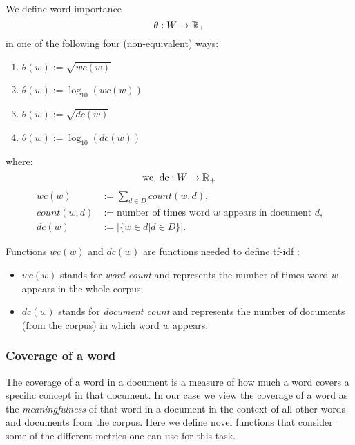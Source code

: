 \begin{definition}
  \label{def:word-importance}
  We define word importance
  \[\theta : W \to \mathbb{R}_+\]
  in one of the following four (non-equivalent) ways:
  \begin{enumerate}
    \item \(\theta(w) := \sqrt{wc(w)}\)
    \item \(\theta(w) := \log_{10}(wc(w))\)
    \item \(\theta(w) := \sqrt{dc(w)}\)
    \item \(\theta(w) := \log_{10}(dc(w))\)
  \end{enumerate}
  where:
  \[\text{wc, dc} : W \to \mathbb{R}_+\]
  \begin{align*}
    wc(w) &:= \sum_{d \in D} count(w, d), \\
    count(w, d) &:= \text{number of times word \(w\) appears in document
      \(d\),} \\
    dc(w) &:= |\{w \in d | d \in D\}|.
  \end{align*}
\end{definition}
Functions \(wc(w)\) and \(dc(w)\) are functions needed to define tf-idf
\cite{}:
\begin{itemize}
  \item \(wc(w)\) stands for \emph{word count} and
    represents the number of times word \(w\) appears in the whole corpus;
  \item \(dc(w)\) stands for \emph{document count} and represents the number of
  documents (from the corpus) in which word \(w\) appears.
\end{itemize}

\subsubsection{Coverage of a word}

The coverage of a word in a document is a measure of how much a word covers a
specific concept in that document. In our case we view the coverage of a word
as the \emph{meaningfulness} of that word in a document in the context of all
other words and documents from the corpus. Here we define novel functions that
consider some of the different metrics one can use for this task.

